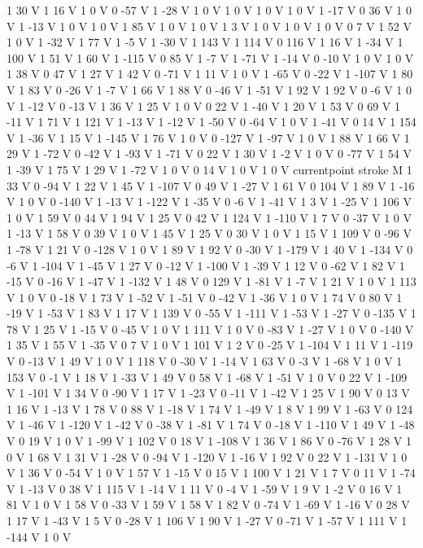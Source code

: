 {{1 30 V
1 16 V
1 0 V
0 -57 V
1 -28 V
1 0 V
1 0 V
1 0 V
1 0 V
1 -17 V
0 36 V
1 0 V
1 -13 V
1 0 V
1 0 V
1 85 V
1 0 V
1 0 V
1 3 V
1 0 V
1 0 V
1 0 V
0 7 V
1 52 V
1 0 V
1 -32 V
1 77 V
1 -5 V
1 -30 V
1 143 V
1 114 V
0 116 V
1 16 V
1 -34 V
1 100 V
1 51 V
1 60 V
1 -115 V
0 85 V
1 -7 V
1 -71 V
1 -14 V
0 -10 V
1 0 V
1 0 V
1 38 V
0 47 V
1 27 V
1 42 V
0 -71 V
1 11 V
1 0 V
1 -65 V
0 -22 V
1 -107 V
1 80 V
1 83 V
0 -26 V
1 -7 V
1 66 V
1 88 V
0 -46 V
1 -51 V
1 92 V
1 92 V
0 -6 V
1 0 V
1 -12 V
0 -13 V
1 36 V
1 25 V
1 0 V
0 22 V
1 -40 V
1 20 V
1 53 V
0 69 V
1 -11 V
1 71 V
1 121 V
1 -13 V
1 -12 V
1 -50 V
0 -64 V
1 0 V
1 -41 V
0 14 V
1 154 V
1 -36 V
1 15 V
1 -145 V
1 76 V
1 0 V
0 -127 V
1 -97 V
1 0 V
1 88 V
1 66 V
1 29 V
1 -72 V
0 -42 V
1 -93 V
1 -71 V
0 22 V
1 30 V
1 -2 V
1 0 V
0 -77 V
1 54 V
1 -39 V
1 75 V
1 29 V
1 -72 V
1 0 V
0 14 V
1 0 V
1 0 V
currentpoint stroke M
1 33 V
0 -94 V
1 22 V
1 45 V
1 -107 V
0 49 V
1 -27 V
1 61 V
0 104 V
1 89 V
1 -16 V
1 0 V
0 -140 V
1 -13 V
1 -122 V
1 -35 V
0 -6 V
1 -41 V
1 3 V
1 -25 V
1 106 V
1 0 V
1 59 V
0 44 V
1 94 V
1 25 V
0 42 V
1 124 V
1 -110 V
1 7 V
0 -37 V
1 0 V
1 -13 V
1 58 V
0 39 V
1 0 V
1 45 V
1 25 V
0 30 V
1 0 V
1 15 V
1 109 V
0 -96 V
1 -78 V
1 21 V
0 -128 V
1 0 V
1 89 V
1 92 V
0 -30 V
1 -179 V
1 40 V
1 -134 V
0 -6 V
1 -104 V
1 -45 V
1 27 V
0 -12 V
1 -100 V
1 -39 V
1 12 V
0 -62 V
1 82 V
1 -15 V
0 -16 V
1 -47 V
1 -132 V
1 48 V
0 129 V
1 -81 V
1 -7 V
1 21 V
1 0 V
1 113 V
1 0 V
0 -18 V
1 73 V
1 -52 V
1 -51 V
0 -42 V
1 -36 V
1 0 V
1 74 V
0 80 V
1 -19 V
1 -53 V
1 83 V
1 17 V
1 139 V
0 -55 V
1 -111 V
1 -53 V
1 -27 V
0 -135 V
1 78 V
1 25 V
1 -15 V
0 -45 V
1 0 V
1 111 V
1 0 V
0 -83 V
1 -27 V
1 0 V
0 -140 V
1 35 V
1 55 V
1 -35 V
0 7 V
1 0 V
1 101 V
1 2 V
0 -25 V
1 -104 V
1 11 V
1 -119 V
0 -13 V
1 49 V
1 0 V
1 118 V
0 -30 V
1 -14 V
1 63 V
0 -3 V
1 -68 V
1 0 V
1 153 V
0 -1 V
1 18 V
1 -33 V
1 49 V
0 58 V
1 -68 V
1 -51 V
1 0 V
0 22 V
1 -109 V
1 -101 V
1 34 V
0 -90 V
1 17 V
1 -23 V
0 -11 V
1 -42 V
1 25 V
1 90 V
0 13 V
1 16 V
1 -13 V
1 78 V
0 88 V
1 -18 V
1 74 V
1 -49 V
1 8 V
1 99 V
1 -63 V
0 124 V
1 -46 V
1 -120 V
1 -42 V
0 -38 V
1 -81 V
1 74 V
0 -18 V
1 -110 V
1 49 V
1 -48 V
0 19 V
1 0 V
1 -99 V
1 102 V
0 18 V
1 -108 V
1 36 V
1 86 V
0 -76 V
1 28 V
1 0 V
1 68 V
1 31 V
1 -28 V
0 -94 V
1 -120 V
1 -16 V
1 92 V
0 22 V
1 -131 V
1 0 V
1 36 V
0 -54 V
1 0 V
1 57 V
1 -15 V
0 15 V
1 100 V
1 21 V
1 7 V
0 11 V
1 -74 V
1 -13 V
0 38 V
1 115 V
1 -14 V
1 11 V
0 -4 V
1 -59 V
1 9 V
1 -2 V
0 16 V
1 81 V
1 0 V
1 58 V
0 -33 V
1 59 V
1 58 V
1 82 V
0 -74 V
1 -69 V
1 -16 V
0 28 V
1 17 V
1 -43 V
1 5 V
0 -28 V
1 106 V
1 90 V
1 -27 V
0 -71 V
1 -57 V
1 111 V
1 -144 V
1 0 V
}}
